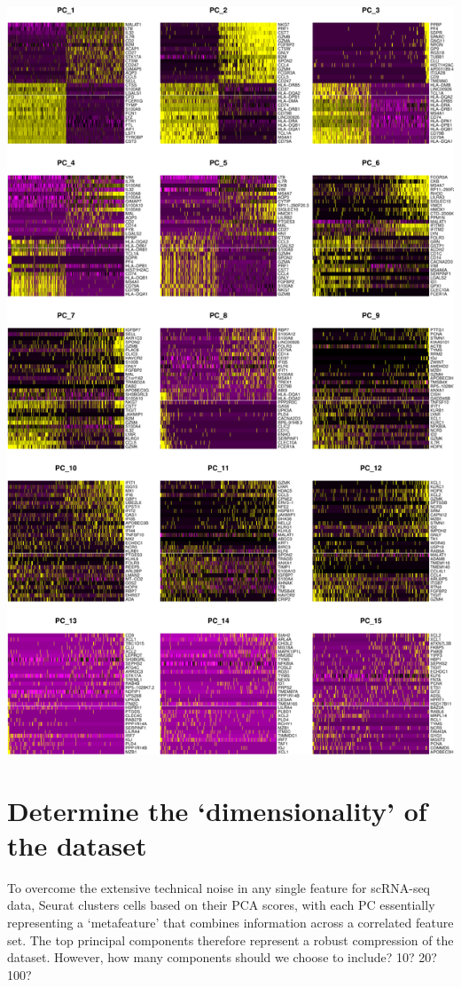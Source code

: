 \documentclass[
]{book}
\begin{document}
\includegraphics{scRNAseqInR_Doco_files/figure-latex/multi-heatmap-1.pdf}

\section{Determine the `dimensionality' of the dataset}\label{determine-the-dimensionality-of-the-dataset}

To overcome the extensive technical noise in any single feature for scRNA-seq data, Seurat clusters cells based on their PCA scores, with each PC essentially representing a `metafeature' that combines information across a correlated feature set. The top principal components therefore represent a robust compression of the dataset. However, how many components should we choose to include? 10? 20? 100?
\end{document}
